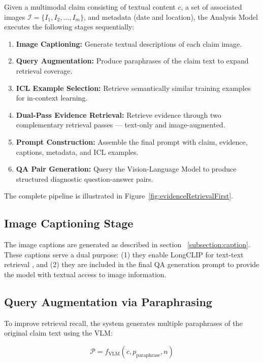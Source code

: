 Given a multimodal claim consisting of textual content $c$, a set of associated images $\mathcal{I} = \{I_1, I_2, \ldots, I_m\}$, and metadata (date and location), the Analysis Model executes the following stages sequentially:

\begin{enumerate}
    \item \textbf{Image Captioning:} Generate textual descriptions of each claim image.
    \item \textbf{Query Augmentation:} Produce paraphrases of the claim text to expand retrieval coverage.
    \item \textbf{ICL Example Selection:} Retrieve semantically similar training examples for in-context learning.
    \item \textbf{Dual-Pass Evidence Retrieval:} Retrieve evidence through two complementary retrieval passes — text-only and image-augmented.
    \item \textbf{Prompt Construction:} Assemble the final prompt with claim, evidence, captions, metadata, and ICL examples.
    \item \textbf{QA Pair Generation:} Query the Vision-Language Model to produce structured diagnostic question-answer pairs.
\end{enumerate}

The complete pipeline is illustrated in Figure~\ref{fig:evidenceRetrievalFirst}.

\subsection{Image Captioning Stage}

The image captions are generated as described in section ~\ref{subsection:caption}. These captions serve a dual purpose: (1) they enable LongCLIP for text-text retrieval , and (2) they are included in the final QA generation prompt to provide the model with textual access to image information.

\subsection{Query Augmentation via Paraphrasing}

To improve retrieval recall, the system generates multiple paraphrases of the original claim text using the VLM:

\begin{equation}
    \mathcal{P} = f_{\text{VLM}}(c, p_{\text{paraphrase}}, n)
\end{equation}

